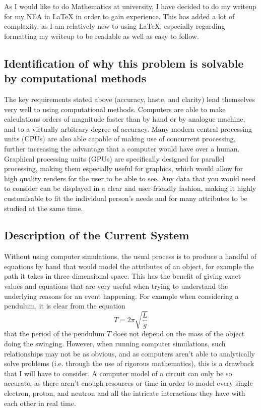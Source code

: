 \documentclass[11pt]{article}
\begin{document}
            As I would like to do Mathematics at university, I have decided to do my writeup for my NEA in LaTeX in order to gain experience. This has added a lot of complexity, as I am relatively new to using LaTeX, especially regarding formatting my writeup to be readable as well as easy to follow.

        \subsection{Identification of why this problem is solvable by computational methods}
            The key requirements stated above (accuracy, haste, and clarity) lend themselves very well to using computational methods. Computers are able to make calculations orders of magnitude faster than by hand or by analogue machine, and to a virtually arbitrary degree of accuracy. Many modern central processing units (CPUs) are also able capable of making use of concurrent processing, further increasing the advantage that a computer would have over a human. Graphical processing units (GPUs) are specifically designed for parallel processing, making them especially useful for graphics, which would allow for high quality renders for the user to be able to see. Any data that you would need to consider can be displayed in a clear and user-friendly fashion, making it highly customisable to fit the individual person's needs and for many attributes to be studied at the same time.

        \subsection{Description of the Current System}
            Without using computer simulations, the usual process is to produce a handful of equations by hand that would model the attributes of an object, for example the path it takes in three-dimensional space. This has the benefit of giving exact values and equations that are very useful when trying to understand the underlying reasons for an event happening. For example when considering a pendulum, it is clear from the equation $$ T = 2 \pi \sqrt{\frac{L}{g}} $$ that the period of the pendulum $T$ does not depend on the mass of the object doing the swinging. However, when running computer simulations, such relationships may not be as obvious, and as computers aren't able to analytically solve problems (i.e. through the use of rigorous mathematics), this is a drawback that I will have to consider. A computer model of a circuit can only be so accurate, as there aren't enough resources or time in order to model every single electron, proton, and neutron and all the intricate interactions they have with each other in real time.
            
\end{document}
